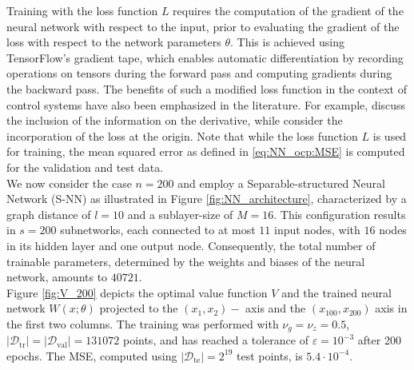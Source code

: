 \documentclass{article}
\newcommand{\dataTrain}{\mathcal{D}_{\text{tr}}}
\newcommand{\dataVal}{\mathcal{D}_{\text{val}}}
\newcommand{\dataTest}{\mathcal{D}_{\text{te}}}
\newcommand{\abs}[1]{\left\lvert {#1} \right\rvert}
\begin{document}
Training with the loss function $L$ requires the computation of the gradient of the neural network with respect to the input, prior to evaluating the gradient of the loss with respect to the network parameters $\theta$. This is achieved using TensorFlow's gradient tape, which enables automatic differentiation by recording operations on tensors during the forward pass and computing gradients during the backward pass. The benefits of such a modified loss function in the context of control systems have also been emphasized in the literature. For example, \cite{azmi2021optimal, kunisch2023optimal, albi2022, dolgov2022data} discuss the inclusion of the information on the derivative, while \cite{kunisch2021semiglobal, breiten2021neural} consider the incorporation of the loss at the origin. Note that while the loss function $L$ is used for training, the mean squared error as defined in \eqref{eq:NN_ocp:MSE} is computed for the validation and test data. \\
We now consider the case $n = 200$ and employ a Separable-structured Neural Network (S-NN) as illustrated in Figure \ref{fig:NN_architecture}, characterized by a graph distance of $l=10$ and a sublayer-size of $M = 16$. This configuration results in $s = 200$ subnetworks, each connected to at most $11$ input nodes, with $16$ nodes in its hidden layer and one output node. Consequently, the total number of trainable parameters, determined by the weights and biases of the neural network, amounts to $40721$. \\ 
Figure \ref{fig:V_200} depicts the optimal value function $V$ and the trained neural network $W(x; \theta)$ projected to the $(x_{1}, x_{2})-$ axis and the $(x_{100}, x_{200})$ axis in the first two columns. The training was performed with $\nu_g = \nu_z = 0.5$, $\abs{\dataTrain} = \abs{\dataVal} = 131072$ points, and has reached a tolerance of $\varepsilon = 10^{-3}$ after {200} epochs. The MSE, computed using $\abs{\dataTest} = 2^{19}$ test points, is ${5.4} \cdot 10^{-4}$.
\end{document}
